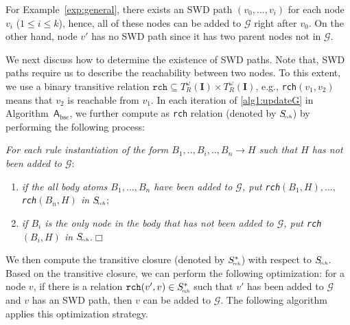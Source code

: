 For Example~\ref{exp:general},
there exists an SWD path $(v_0,\ldots,v_i)$ for each node $v_i$
($1\leq i\leq k$), hence, all of these nodes
can be added to $\mathcal{G}$ right after $v_0$. On the other hand,
node $v'$ has no SWD path since it has two parent nodes not in $\mathcal{G}$.

We next discuss how to determine the existence of SWD paths. Note that, SWD paths require us to
describe the reachability between two nodes. To this extent, we use a
binary transitive relation $\texttt{rch} \subseteq T_R^{\omega}(\textbf{I})\times T_R^{\omega}(\textbf{I})$,
e.g., \texttt{rch}$(v_1,v_2)$ means that $v_2$ is reachable from $v_1$.
In each iteration of \ref{alg1:updateG} in Algorithm~$\mathsf{A}_{\text{bsc}}$, we further compute as \texttt{rch}
relation (denoted by $S_{\textit{\!\tiny rch}}$) by performing the following process:

\begin{description}[leftmargin=4ex]
\item[(\textbf{\dag})] \emph{For each rule instantiation of the form $B_1,..,B_i,..,B_n\rightarrow H$
such that $H$ has not been added to $\mathcal{G}$}:
\begin{enumerate}[leftmargin=0ex]
\item \emph{if the all body atoms $B_1,\ldots,B_n$ have been added to $\mathcal{G}$, put \texttt{rch}$(B_1,H),\ldots,$ \texttt{rch}$(B_n,H)$ in $S_{\textit{\!\tiny rch}}$};
\item \emph{if $B_i$ is the only node in the body that has not been added to $\mathcal{G}$,
    put \texttt{rch}$(B_i,H)$ in $S_{\textit{\!\tiny rch}}$}.\hfill$\Box$
\end{enumerate}
\end{description}

We then compute the transitive closure (denoted by $S^*_{\!\textit{\tiny rch}}$) with respect to
$S_{\!\textit{\tiny rch}}$. Based on the transitive closure, we can
perform the following optimization:
for a node $v$, if there is a relation $\texttt{rch}(v',v)\in S^*_{\!\textit{\tiny rch}}$
such that $v'$ has been added to $\mathcal{G}$ and $v$ has an SWD
path, then $v$ can be added to $\mathcal{G}$.
The following algorithm applies this optimization strategy.\\

